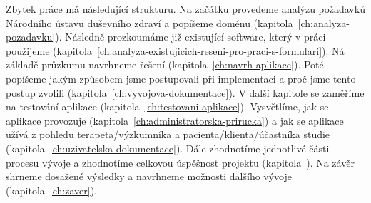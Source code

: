Zbytek práce má následující strukturu.
Na začátku provedeme analýzu požadavků Národního ústavu duševního zdraví a popíšeme doménu (kapitola~\ref{ch:analyza-pozadavku}).
Následně prozkoumáme již existující software, který v práci použijeme (kapitola~\ref{ch:analyza-existujicich-reseni-pro-praci-s-formulari}).
Ná základě průzkumu navrhneme řešení (kapitola~\ref{ch:navrh-aplikace}).
Poté popíšeme jakým způsobem jsme postupovali při implementaci a proč jsme tento postup zvolili (kapitola~\ref{ch:vyvojova-dokumentace}).
V další kapitole se zaměříme na testování aplikace (kapitola~\ref{ch:testovani-aplikace}).
Vysvětlíme, jak se aplikace provozuje (kapitola~\ref{ch:administratorska-prirucka}) a jak se aplikace užívá z pohledu terapeta/výzkumníka a pacienta/klienta/účastníka studie (kapitola~\ref{ch:uzivatelska-dokumentace}).
Dále zhodnotíme jednotlivé části procesu vývoje a zhodnotíme celkovou úspěšnost projektu (kapitola~).
Na závěr shrneme dosažené výsledky a navrhneme možnosti dalšího vývoje (kapitola~\ref{ch:zaver}).